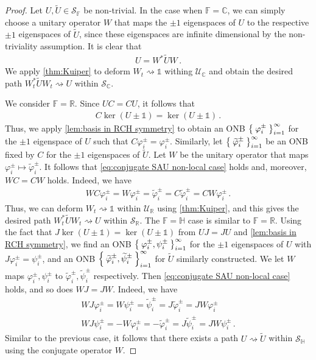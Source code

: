 \documentclass[a4paper,10pt]{article}
\numberwithin{equation}{section}
\theoremstyle{plain}
\theoremstyle{plain}
\theoremstyle{plain}
\theoremstyle{plain}
\theoremstyle{plain}
\theoremstyle{remark}
\theoremstyle{definition}
\theoremstyle{plain}
\newcommand{\RR}{\mathbb{R}}
\newcommand{\CC}{\mathbb{C}}
\newcommand{\FF}{\mathbb{F}}
\newcommand{\calU}{\mathcal{U}}
\newcommand{\calS}{\mathcal{S}}
\newcommand{\ti}[1]{\widetilde{#1}}
\newcommand{\vf}{\varphi}
\newcommand{\Id}{\mathds{1}}
\newcommand{\HH}{\mathbb{H}}
\newcommand{\eq}[1]{\begin{align*}#1\end{align*}}
\newcommand{\eql}[1]{\begin{align}#1\end{align}}
\begin{document}
		\begin{proof}
			Let $U,\ti U\in\calS_\FF$ be non-trivial. In the case when $\FF=\CC$, we can simply choose a unitary operator $W$ that maps the $\pm 1$ eigenspaces of $U$ to the respective $\pm 1$ eigenspaces of $\ti U$, since these eigenspaces are infinite dimensional by the non-triviality assumption. It is clear that \eql{\label{eq:conjugate SAU non-local case}U=W^*\ti{U}W\,.}
			We apply \cref{thm:Kuiper} to deform $W_t\rightsquigarrow \Id$ withing $\calU_\CC$ and obtain the desired path $W_t^*\ti{U} W_t\rightsquigarrow U$ within $\calS_\CC.$ 
			
			We consider $\FF=\RR$. Since $UC=CU$, it follows that \eq{C\ker(U\pm \Id) = \ker(U\pm \Id)\,.} 
			Thus, we apply \cref{lem:basis in RCH symmetry} to obtain an ONB $\Set{\vf_i^\pm}_{i=1}^\infty$ for the $\pm 1$ eigenspace of $U$ such that $C\vf_i^\pm=\vf_i^\pm$. Similarly, let $\Set{\ti{\vf}_i^\pm}_{i=1}^\infty$ be an ONB fixed by $C$ for the $\pm 1$ eigenspaces of $\ti U$. Let $W$ be the unitary operator that maps $\vf_i^\pm\mapsto \ti{\vf}_i^\pm$. It follows that \cref{eq:conjugate SAU non-local case} holds and, moreover, $WC=CW$ holds. Indeed, we have \eq{WC\vf_i^\pm=W\vf_i^\pm=\ti{\vf}_i^\pm = C\ti{\vf}_i^\pm=CW\vf_i^\pm\,.} 
			Thus, we can deform $W_t\rightsquigarrow \Id$ within $\calU_\RR$ using \cref{thm:Kuiper}, and this gives the desired path $W_t^*\ti{U} W_t\rightsquigarrow U$ within $\calS_\RR$. 
			The $\FF=\HH$ case is similar to $\FF=\RR$. Using the fact that $J\ker(U\pm \Id)=\ker(U\pm \Id)$ from $UJ=JU$ and \cref{lem:basis in RCH symmetry}, we find an ONB $\Set{\vf^\pm_i,\psi^\pm_i}_{i=1}^\infty$ for the $\pm 1$ eigenspaces of $U$ with $J\vf_i^\pm=\psi_i^\pm$, and an ONB $\Set{\ti{\vf}^\pm_i,\ti{\psi}^\pm_i}_{i=1}^\infty$ for $\ti{U}$ similarly constructed. We let $W$ maps $\vf^\pm_i,\psi^\pm_i$ to $\ti{\vf}^\pm_i,\ti{\psi}^\pm_i$ respectively. Then \cref{eq:conjugate SAU non-local case} holds, and so does $WJ=JW$. Indeed, we have \eq{WJ\vf^\pm_i=W\psi^\pm_i=\ti{\psi}^\pm_i=J\ti{\vf}^\pm_i=JW\vf_i^\pm \\ WJ\psi^\pm_i=-W\vf^\pm_i=-\ti{\vf}^\pm_i=J\ti{\psi}^\pm_i=JW\psi_i^\pm\,.} Similar to the previous case, it follows that there exists a path $U\rightsquigarrow \ti{U}$ within $\calS_\HH$ using the conjugate operator $W$.
			

\end{proof}
\end{document}
